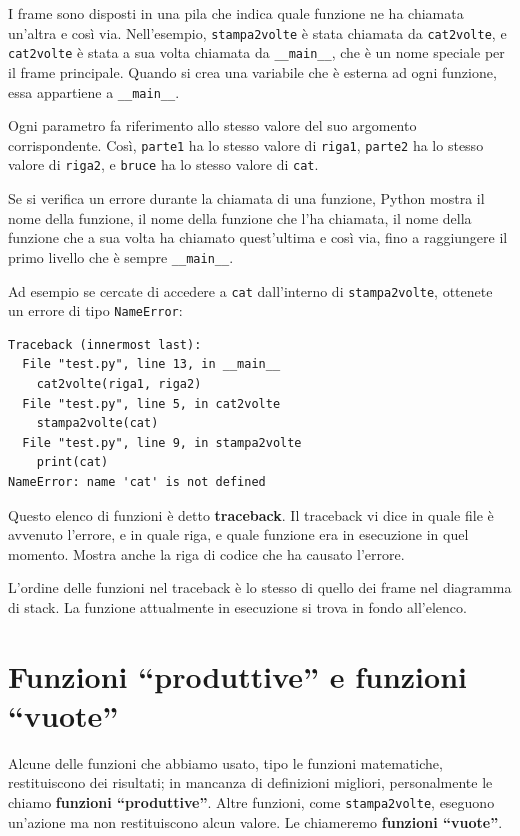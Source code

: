 \documentclass[10pt]{book}
\begin{document}
I frame sono disposti in una pila che indica quale funzione ne ha chiamata un'altra e così via. Nell'esempio, \verb"stampa2volte" è stata chiamata da \verb"cat2volte", e \verb"cat2volte" è stata a sua volta chiamata da 
\verb"__main__", che è un nome speciale per il frame principale. Quando si crea una variabile che è esterna ad ogni funzione, essa appartiene a 
\verb"__main__".

Ogni parametro fa riferimento allo stesso valore del suo argomento corrispondente. Così, {\tt parte1} ha lo stesso valore di
{\tt riga1}, {\tt parte2} ha lo stesso valore di {\tt riga2},
e {\tt bruce} ha lo stesso valore di {\tt cat}.

Se si verifica un errore durante la chiamata di una funzione, Python mostra il nome della funzione, il nome della funzione che l'ha chiamata, il nome della funzione che a sua volta ha chiamato quest'ultima e così via, fino a raggiungere il primo livello che è sempre \verb"__main__".

Ad esempio se cercate di accedere a {\tt cat} dall'interno di
\verb"stampa2volte", ottenete un errore di tipo {\tt NameError}:

\begin{verbatim}
Traceback (innermost last):
  File "test.py", line 13, in __main__
    cat2volte(riga1, riga2)
  File "test.py", line 5, in cat2volte
    stampa2volte(cat)
  File "test.py", line 9, in stampa2volte
    print(cat)
NameError: name 'cat' is not defined
\end{verbatim}
%
Questo elenco di funzioni è detto {\bf traceback}. Il traceback vi dice in quale file è avvenuto l'errore, e in quale riga, e quale funzione era in esecuzione in quel momento. Mostra anche la riga di codice che ha causato l'errore.

L'ordine delle funzioni nel traceback è lo stesso di quello dei frame nel diagramma di stack. La funzione attualmente in esecuzione si trova in fondo all'elenco.


\section{Funzioni ``produttive'' e funzioni ``vuote''}

Alcune delle funzioni che abbiamo usato, tipo le funzioni matematiche, restituiscono dei risultati; in mancanza di definizioni migliori, personalmente le chiamo {\bf funzioni ``produttive''}.  Altre funzioni, come \verb"stampa2volte", eseguono un'azione ma non restituiscono alcun valore. Le chiameremo {\bf funzioni ``vuote''}.
\end{document}
